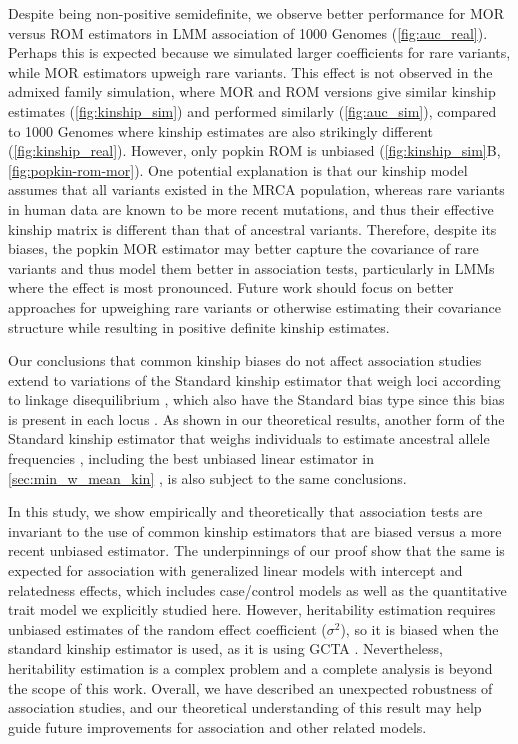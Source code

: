\documentclass[11pt]{article}
\begin{document}
Despite being non-positive semidefinite, we observe better performance for MOR versus ROM estimators in LMM association of 1000 Genomes (\cref{fig:auc_real}).
Perhaps this is expected because we simulated larger coefficients for rare variants, while MOR estimators upweigh rare variants.
This effect is not observed in the admixed family simulation, where MOR and ROM versions give similar kinship estimates (\cref{fig:kinship_sim}) and performed similarly (\cref{fig:auc_sim}), compared to 1000 Genomes where kinship estimates are also strikingly different (\cref{fig:kinship_real}).
However, only popkin ROM is unbiased (\cref{fig:kinship_sim}B, \cref{fig:popkin-rom-mor}).
One potential explanation is that our kinship model assumes that all variants existed in the MRCA population, whereas rare variants in human data are known to be more recent mutations, and thus their effective kinship matrix is different than that of ancestral variants.
Therefore, despite its biases, the popkin MOR estimator may better capture the covariance of rare variants and thus model them better in association tests, particularly in LMMs where the effect is most pronounced.
Future work should focus on better approaches for upweighing rare variants or otherwise estimating their covariance structure while resulting in positive definite kinship estimates.

Our conclusions that common kinship biases do not affect association studies extend to variations of the Standard kinship estimator that weigh loci according to linkage disequilibrium \citep{speed_reevaluation_2017, wang_efficient_2017}, which also have the Standard bias type since this bias is present in each locus \citep{ochoa_estimating_2021}.
As shown in our theoretical results, another form of the Standard kinship estimator that weighs individuals to estimate ancestral allele frequencies \pith, including the best unbiased linear estimator in \cref{sec:min_w_mean_kin} \citep{astle_population_2009, thornton_roadtrips:_2010}, is also subject to the same conclusions.

In this study, we show empirically and theoretically that association tests are invariant to the use of common kinship estimators that are biased versus a more recent unbiased estimator.
The underpinnings of our proof show that the same is expected for association with generalized linear models with intercept and relatedness effects, which includes case/control models as well as the quantitative trait model we explicitly studied here.
However, heritability estimation requires unbiased estimates of the random effect coefficient ($\sigma^2$), so it is biased when the standard kinship estimator is used, as it is using GCTA \citep{yang_gcta:_2011, yang_advantages_2014}.
Nevertheless, heritability estimation is a complex problem and a complete analysis is beyond the scope of this work.
Overall, we have described an unexpected robustness of association studies, and our theoretical understanding of this result may help guide future improvements for association and other related models.
\end{document}
